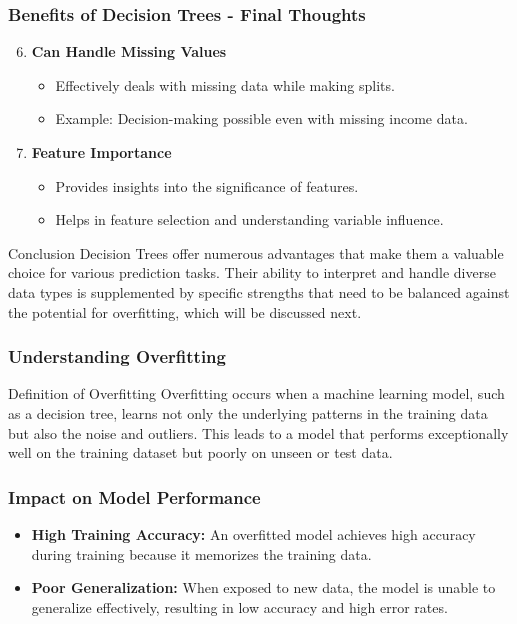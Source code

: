 \documentclass[aspectratio=169]{beamer}
\begin{document}
\begin{frame}[fragile]
  \frametitle{Benefits of Decision Trees - Final Thoughts}
  \begin{enumerate}
    \setcounter{enumi}{5} %
    \item \textbf{Can Handle Missing Values}
      \begin{itemize}
        \item Effectively deals with missing data while making splits.
        \item Example: Decision-making possible even with missing income data.
      \end{itemize}
      
    \item \textbf{Feature Importance}
      \begin{itemize}
        \item Provides insights into the significance of features.
        \item Helps in feature selection and understanding variable influence.
      \end{itemize}
  \end{enumerate}
  \begin{block}{Conclusion}
    Decision Trees offer numerous advantages that make them a valuable choice for various prediction tasks. 
    Their ability to interpret and handle diverse data types is supplemented by specific strengths that need to be balanced against the potential for overfitting, which will be discussed next.
  \end{block}
\end{frame}

\begin{frame}[fragile]
  \frametitle{Understanding Overfitting}
  \begin{block}{Definition of Overfitting}
    Overfitting occurs when a machine learning model, such as a decision tree, learns not only the underlying patterns in the training data but also the noise and outliers. This leads to a model that performs exceptionally well on the training dataset but poorly on unseen or test data.
  \end{block}
\end{frame}

\begin{frame}[fragile]
  \frametitle{Impact on Model Performance}
  \begin{itemize}
    \item \textbf{High Training Accuracy:} An overfitted model achieves high accuracy during training because it memorizes the training data.
    \item \textbf{Poor Generalization:} When exposed to new data, the model is unable to generalize effectively, resulting in low accuracy and high error rates.
  \end{itemize}
\end{frame}
\end{document}
